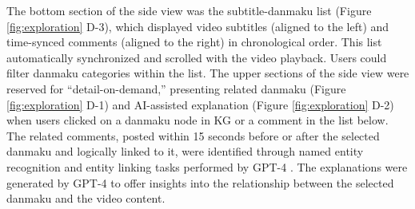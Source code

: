 The bottom section of the side view was the subtitle-danmaku list (Figure \ref{fig:exploration} D-3), which displayed video subtitles (aligned to the left) and time-synced comments (aligned to the right) in chronological order. This list automatically synchronized and scrolled with the video playback. 
Users could filter danmaku categories within the list.
The upper sections of the side view were reserved for ``detail-on-demand,'' presenting related danmaku (Figure \ref{fig:exploration} D-1) and AI-assisted explanation (Figure \ref{fig:exploration} D-2) when users clicked on a danmaku node in KG or a comment in the list below. 
The related comments, posted within 15 seconds before or after the selected danmaku and logically linked to it, were identified through named entity recognition and entity linking tasks performed by GPT-4 \cite{achiam2023gpt}.
The explanations were generated by GPT-4 \cite{achiam2023gpt} to offer insights into the relationship between the selected danmaku and the video content. 



